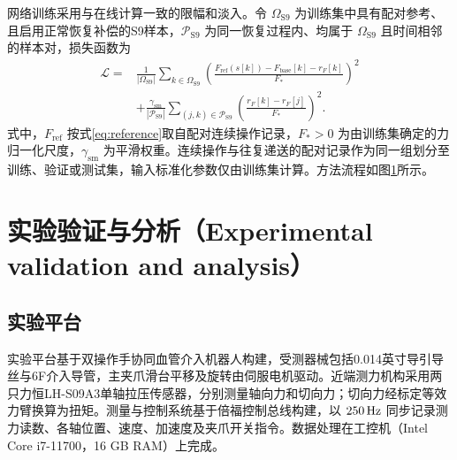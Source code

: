 \documentclass{JQR_LaTeX_Template-0507/JQRnew}
\providecommand{\RevisionColor}{\color{black}}
\newcommand{\revbegin}{\begingroup\RevisionColor}
\newcommand{\revend}{\par\endgroup}
\begin{document}
网络训练采用与在线计算一致的限幅和淡入。令 $\Omega_{\mathrm{S9}}$ 为训练集中具有配对参考、且启用正常恢复补偿的S9样本，$\mathcal P_{\mathrm{S9}}$ 为同一恢复过程内、均属于 $\Omega_{\mathrm{S9}}$ 且时间相邻的样本对，损失函数为
\begin{equation}
\label{eq:gru-loss}
\begin{aligned}
\mathcal L={}&\frac{1}{|\Omega_{\mathrm{S9}}|}\sum_{k\in\Omega_{\mathrm{S9}}}
\left(\frac{F_{\mathrm{ref}}(s[k])-F_{\mathrm{base}}[k]-r_F[k]}{F_*}\right)^2\\
&+\frac{\gamma_{\mathrm{sm}}}{|\mathcal P_{\mathrm{S9}}|}
\sum_{(j,k)\in\mathcal P_{\mathrm{S9}}}
\left(\frac{r_F[k]-r_F[j]}{F_*}\right)^2.
\end{aligned}
\end{equation}
式中，$F_{\mathrm{ref}}$ 按式\eqref{eq:reference}取自配对连续操作记录，$F_*>0$ 为由训练集确定的力归一化尺度，$\gamma_{\mathrm{sm}}$ 为平滑权重。连续操作与往复递送的配对记录作为同一组划分至训练、验证或测试集，输入标准化参数仅由训练集计算。方法流程如图\ref{fig4}所示。

\begin{figure}[H]
\centering
{}
\label{fig4}
\end{figure}

\section{实验验证与分析（Experimental validation and analysis）}

\subsection{实验平台}

\revbegin
实验平台基于双操作手协同血管介入机器人构建，受测器械包括0.014英寸导引导丝与6F介入导管，主夹爪滑台平移及旋转由伺服电机驱动。近端测力机构采用两只力恒LH-S09A3单轴拉压传感器，分别测量轴向力和切向力；切向力经标定等效力臂换算为扭矩。测量与控制系统基于倍福控制总线构建，以 $250\,{\rm Hz}$ 同步记录测力读数、各轴位置、速度、加速度及夹爪开关指令。数据处理在工控机（Intel Core i7-11700，16 GB RAM）上完成。
\revend
\end{document}
